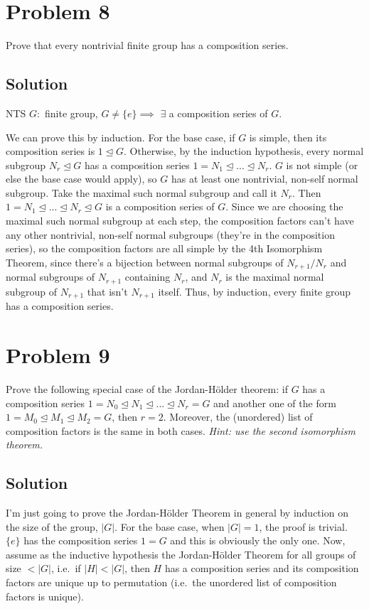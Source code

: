 \documentclass[fleqn]{article}
\begin{document}
    \section{Problem 8}
    Prove that every nontrivial finite group has a composition series.
        
        \subsection{Solution}
        NTS $G:$ finite group, $G \neq \{e\} \implies$ $\exists$ a composition series of $G$.
        
        We can prove this by induction.  For the base case, if $G$ is simple, then its composition series is $1 \unlhd G$.  Otherwise, by the induction hypothesis, every normal subgroup $N_r \unlhd G$ has a composition series $1 = N_1 \unlhd ... \unlhd N_r$.  $G$ is not simple (or else the base case would apply), so $G$ has at least one nontrivial, non-self normal subgroup.  Take the maximal such normal subgroup and call it $N_r$.  Then $1 = N_1 \unlhd ... \unlhd N_r \unlhd G$ is a composition series of $G$.  Since we are choosing the maximal such normal subgroup at each step, the composition factors can't have any other nontrivial, non-self normal subgroups (they're in the composition series), so the composition factors are all simple by the 4th Isomorphism Theorem, since there's a bijection between normal subgroups of $N_{r + 1}/N_r$ and normal subgroups of $N_{r + 1}$ containing $N_r$, and $N_r$ is the maximal normal subgroup of $N_{r + 1}$ that isn't $N_{r + 1}$ itself.  Thus, by induction, every finite group has a composition series.
    
    \pagebreak
    
    \section{Problem 9}
    Prove the following special case of the Jordan-Hölder theorem: if $G$ has a composition series $1 = N_0 \unlhd N_1 \unlhd ... \unlhd N_r = G$ and another one of the form $1 = M_0 \unlhd M_1 \unlhd M_2 = G$, then $r = 2$.  Moreover, the (unordered) list of composition factors is the same in both cases.  \textit{Hint: use the second isomorphism theorem.}
        
        \subsection{Solution}
        I'm just going to prove the Jordan-Hölder Theorem in general by induction on the size of the group, $|G|$.  For the base case, when $|G| = 1$, the proof is trivial.  $\{e\}$ has the composition series $1 = G$ and this is obviously the only one.  Now, assume as the inductive hypothesis the Jordan-Hölder Theorem for all groups of size $< |G|$, i.e.\ if $|H| < |G|$, then $H$ has a composition series and its composition factors are unique up to permutation (i.e.\ the unordered list of composition factors is unique).
        
\end{document}
